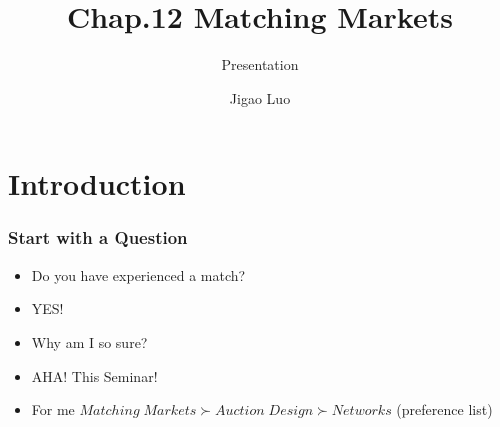 \documentclass{beamer}
\title{Chap.12 Matching Markets}
\subtitle{Presentation}
\author{Jigao Luo}
\institute[]{TUM}
\begin{document}
\begin{frame}
\titlepage
\end{frame}

\section{Introduction}
\begin{frame} 
		\tableofcontents[currentsection]
\end{frame}

\begin{frame}
	\frametitle{Start with a Question}
	\begin{itemize}
		\pause
		\item Do you have experienced a match?
		\pause
		\item YES!
		\pause 
		\item Why am I so sure?
		\pause
		\vspace{1cm}
		\item AHA! This Seminar!
		\pause
		\item For me $Matching \;Markets \succ Auction \;Design \succ Networks$ (preference list)
	\end{itemize}
\end{frame}



\end{document}
